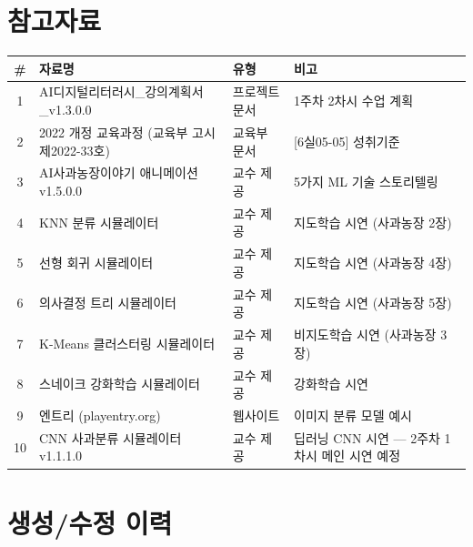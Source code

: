\documentclass[11pt,a4paper]{article}
\renewcommand{\arraystretch}{1.4}
\begin{document}
\section*{참고자료}

\begin{center}
\renewcommand{\arraystretch}{1.4}
\begin{tabular}{|c|p{6cm}|p{2.5cm}|p{3.5cm}|}
\hline
\rowcolor{tableheader}
\textbf{\#} & \textbf{자료명} & \textbf{유형} & \textbf{비고} \\
\hline
1 & AI디지털리터러시\_강의계획서\_v1.3.0.0 & 프로젝트 문서 & 1주차 2차시 수업 계획 \\
\hline
2 & 2022 개정 교육과정 (교육부 고시 제2022-33호) & 교육부 문서 & [6실05-05] 성취기준 \\
\hline
3 & AI사과농장이야기 애니메이션 v1.5.0.0 & 교수 제공 & 5가지 ML 기술 스토리텔링 \\
\hline
4 & KNN 분류 시뮬레이터 & 교수 제공 & 지도학습 시연 (사과농장 2장) \\
\hline
5 & 선형 회귀 시뮬레이터 & 교수 제공 & 지도학습 시연 (사과농장 4장) \\
\hline
6 & 의사결정 트리 시뮬레이터 & 교수 제공 & 지도학습 시연 (사과농장 5장) \\
\hline
7 & K-Means 클러스터링 시뮬레이터 & 교수 제공 & 비지도학습 시연 (사과농장 3장) \\
\hline
8 & 스네이크 강화학습 시뮬레이터 & 교수 제공 & 강화학습 시연 \\
\hline
9 & 엔트리 (playentry.org) & 웹사이트 & 이미지 분류 모델 예시 \\
\hline
10 & CNN 사과분류 시뮬레이터 v1.1.1.0 & 교수 제공 & 딥러닝 CNN 시연 — 2주차 1차시 메인 시연 예정 \\
\hline
\end{tabular}
\end{center}

\section*{생성/수정 이력}
\end{document}
